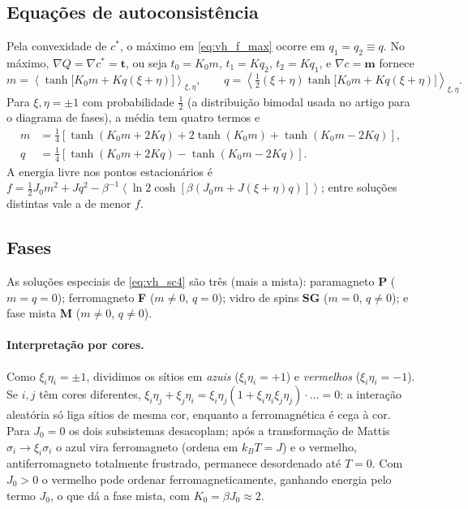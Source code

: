 \documentclass[12pt,a4paper]{article}
\newcommand{\avg}[1]{\left\langle #1\right\rangle}
\begin{document}
\subsection*{Equações de autoconsistência}
Pela convexidade de $c^*$, o máximo em \eqref{eq:vh_f_max} ocorre em
$q_1=q_2\equiv q$. No máximo, $\nabla Q=\nabla c^*=\mathbf{t}$, ou seja
$t_0=K_0m$, $t_1=Kq_2$, $t_2=Kq_1$, e $\nabla c=\mathbf{m}$ fornece
%
\begin{equation}
    m=\avg{\tanh\!\big[K_0m+Kq(\xi+\eta)\big]}_{\xi,\eta},\qquad
    q=\avg{\tfrac12(\xi+\eta)\tanh\!\big[K_0m+Kq(\xi+\eta)\big]}_{\xi,\eta}.
    \label{eq:vh_sc}
\end{equation}
%
Para $\xi,\eta=\pm1$ com probabilidade $\tfrac12$ (a distribuição
bimodal usada no artigo para o diagrama de fases), a média tem quatro termos e
%
\begin{equation}
    \begin{aligned}
    m&=\tfrac14\left[\tanh(K_0m+2Kq)+2\tanh(K_0m)+\tanh(K_0m-2Kq)\right],\\
    q&=\tfrac14\left[\tanh(K_0m+2Kq)-\tanh(K_0m-2Kq)\right].
    \end{aligned}
    \label{eq:vh_sc4}
\end{equation}
%
A energia livre nos pontos estacionários é
$f=\tfrac12J_0m^2+Jq^2-\beta^{-1}\avg{\ln2\cosh[\beta(J_0m+J(\xi+\eta)q)]}$;
entre soluções distintas vale a de menor $f$.

\subsection*{Fases}
As soluções especiais de \eqref{eq:vh_sc4} são três (mais a mista):
paramagneto \textbf{P} ($m=q=0$); ferromagneto \textbf{F} ($m\neq0$,
$q=0$); vidro de spins \textbf{SG} ($m=0$, $q\neq0$); e fase mista
\textbf{M} ($m\neq0$, $q\neq0$).

\paragraph{Interpretação por cores.}
Como $\xi_i\eta_i=\pm1$, dividimos os sítios em \emph{azuis}
($\xi_i\eta_i=+1$) e \emph{vermelhos} ($\xi_i\eta_i=-1$). Se $i,j$ têm
cores diferentes, $\xi_i\eta_j+\xi_j\eta_i=\xi_i\eta_j(1+\xi_i\eta_i\xi_j\eta_j)\!\cdot\!\ldots=0$:
a interação aleatória só liga sítios de mesma cor, enquanto a
ferromagnética é cega à cor. Para $J_0=0$ os dois subsistemas desacoplam;
após a transformação de Mattis $\sigma_i\to\xi_i\sigma_i$ o azul vira
ferromagneto (ordena em $k_BT=J$) e o vermelho, antiferromagneto
totalmente frustrado, permanece desordenado até $T=0$. Com $J_0>0$ o
vermelho pode ordenar ferromagneticamente, ganhando energia pelo termo
$J_0$, o que dá a fase mista, com $K_0=\beta J_0\approx2$.
\end{document}
